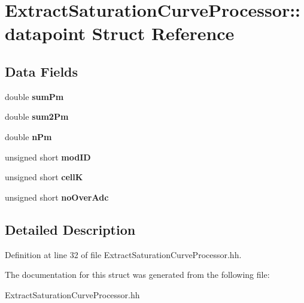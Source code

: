 \section{ExtractSaturationCurveProcessor::datapoint Struct Reference}
\label{structExtractSaturationCurveProcessor_1_1datapoint}
\subsection*{Data Fields}
\begin{DoxyCompactItemize}
\item 
double {\bfseries sumPm}\label{structExtractSaturationCurveProcessor_1_1datapoint_a95a66cd8dc11004ee0d5bec531b6f9a3}

\item 
double {\bfseries sum2Pm}\label{structExtractSaturationCurveProcessor_1_1datapoint_a175a8abce00fbf18204150113b5f1dd2}

\item 
double {\bfseries nPm}\label{structExtractSaturationCurveProcessor_1_1datapoint_ad6da2b245ba9533d32814a282043b131}

\item 
unsigned short {\bfseries modID}\label{structExtractSaturationCurveProcessor_1_1datapoint_ad82b7c88318e0150ddd4c5ef5b0246aa}

\item 
unsigned short {\bfseries cellK}\label{structExtractSaturationCurveProcessor_1_1datapoint_a00e2b475749c963975f90148f7e31112}

\item 
unsigned short {\bfseries noOverAdc}\label{structExtractSaturationCurveProcessor_1_1datapoint_ae299248e5420388f5c3cd72a8ca71d39}

\end{DoxyCompactItemize}


\subsection{Detailed Description}


Definition at line 32 of file ExtractSaturationCurveProcessor.hh.

The documentation for this struct was generated from the following file:\begin{DoxyCompactItemize}
\item 
ExtractSaturationCurveProcessor.hh\end{DoxyCompactItemize}
